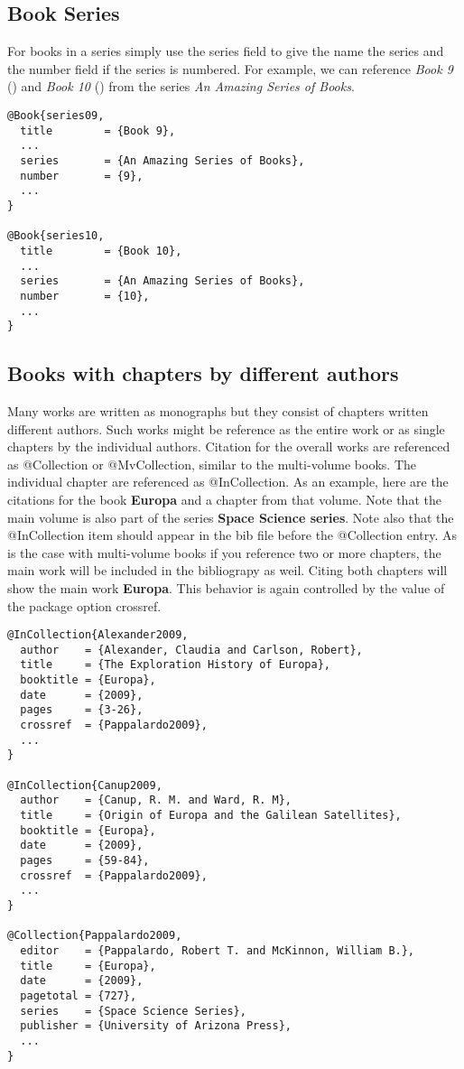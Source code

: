 \subsection{Book Series}

For books in a series simply use the {\ttfamily series} field to give
the name the series and the {\ttfamily number} field if the series is
numbered. For example, we can reference {\itshape Book 9}
(\cite{book09}) and {\itshape Book 10} (\cite{book10}) from the series
{\itshape An Amazing Series of Books}.

\begin{verbatim}
@Book{series09,
  title        = {Book 9},
  ...
  series       = {An Amazing Series of Books},
  number       = {9},
  ...
}

@Book{series10,
  title        = {Book 10},
  ...
  series       = {An Amazing Series of Books},
  number       = {10},
  ...
}
\end{verbatim}


\subsection{Books with chapters by different authors}

Many works are written as monographs but they consist of chapters
written different authors. Such works might be reference as the entire
work or as single chapters by the individual authors. Citation for the
overall works are referenced as {\ttfamily @Collection} or {\ttfamily
  @MvCollection}, similar to the multi-volume books.  The individual
chapter are referenced as {\ttfamily @InCollection}. As an example,
here are the citations for the book {\bfseries Europa} and a chapter
from that volume.  Note that the main volume is also part of the
series {\bfseries Space Science series}. Note also that the {\ttfamily
  @InCollection} item should appear in the bib file before the
{\ttfamily @Collection} entry. As is the case with multi-volume books
if you reference two or more chapters, the main work will be included
in the bibliograpy as weil. Citing both chapters \cite{Alexander2009,
  Canup2009} will show the main work {\bfseries Europa}. This behavior
is again controlled by the value of the package option {\ttfamily
  crossref}.


\begin{verbatim}
@InCollection{Alexander2009,
  author    = {Alexander, Claudia and Carlson, Robert},
  title     = {The Exploration History of Europa},
  booktitle = {Europa},
  date      = {2009},
  pages     = {3-26},
  crossref  = {Pappalardo2009},
  ...
}

@InCollection{Canup2009,
  author    = {Canup, R. M. and Ward, R. M},
  title     = {Origin of Europa and the Galilean Satellites},
  booktitle = {Europa},
  date      = {2009},
  pages     = {59-84},
  crossref  = {Pappalardo2009},
  ...
}

@Collection{Pappalardo2009,
  editor    = {Pappalardo, Robert T. and McKinnon, William B.},
  title     = {Europa},
  date      = {2009},
  pagetotal = {727},
  series    = {Space Science Series},
  publisher = {University of Arizona Press},
  ...
}
\end{verbatim}

